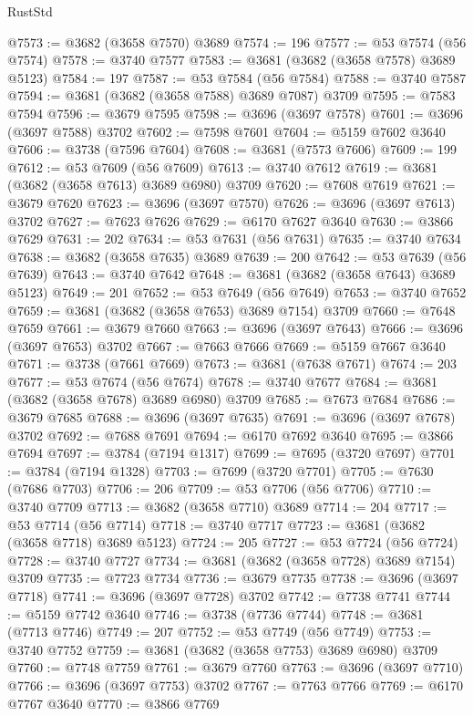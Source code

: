 \begin{lexlean}{RustStd}
\begin{coremodule}
@7573 := @3682 (@3658 @7570) @3689
@7574 := 196
@7577 := @53 @7574 (@56 @7574)
@7578 := @3740 @7577
@7583 := @3681 (@3682 (@3658 @7578) @3689 @5123)
@7584 := 197
@7587 := @53 @7584 (@56 @7584)
@7588 := @3740 @7587
@7594 := @3681 (@3682 (@3658 @7588) @3689 @7087) @3709
@7595 := @7583 @7594
@7596 := @3679 @7595
@7598 := @3696 (@3697 @7578)
@7601 := @3696 (@3697 @7588) @3702
@7602 := @7598 @7601
@7604 := @5159 @7602 @3640
@7606 := @3738 (@7596 @7604)
@7608 := @3681 (@7573 @7606)
@7609 := 199
@7612 := @53 @7609 (@56 @7609)
@7613 := @3740 @7612
@7619 := @3681 (@3682 (@3658 @7613) @3689 @6980) @3709
@7620 := @7608 @7619
@7621 := @3679 @7620
@7623 := @3696 (@3697 @7570)
@7626 := @3696 (@3697 @7613) @3702
@7627 := @7623 @7626
@7629 := @6170 @7627 @3640
@7630 := @3866 @7629
@7631 := 202
@7634 := @53 @7631 (@56 @7631)
@7635 := @3740 @7634
@7638 := @3682 (@3658 @7635) @3689
@7639 := 200
@7642 := @53 @7639 (@56 @7639)
@7643 := @3740 @7642
@7648 := @3681 (@3682 (@3658 @7643) @3689 @5123)
@7649 := 201
@7652 := @53 @7649 (@56 @7649)
@7653 := @3740 @7652
@7659 := @3681 (@3682 (@3658 @7653) @3689 @7154) @3709
@7660 := @7648 @7659
@7661 := @3679 @7660
@7663 := @3696 (@3697 @7643)
@7666 := @3696 (@3697 @7653) @3702
@7667 := @7663 @7666
@7669 := @5159 @7667 @3640
@7671 := @3738 (@7661 @7669)
@7673 := @3681 (@7638 @7671)
@7674 := 203
@7677 := @53 @7674 (@56 @7674)
@7678 := @3740 @7677
@7684 := @3681 (@3682 (@3658 @7678) @3689 @6980) @3709
@7685 := @7673 @7684
@7686 := @3679 @7685
@7688 := @3696 (@3697 @7635)
@7691 := @3696 (@3697 @7678) @3702
@7692 := @7688 @7691
@7694 := @6170 @7692 @3640
@7695 := @3866 @7694
@7697 := @3784 (@7194 @1317)
@7699 := @7695 (@3720 @7697)
@7701 := @3784 (@7194 @1328)
@7703 := @7699 (@3720 @7701)
@7705 := @7630 (@7686 @7703)
@7706 := 206
@7709 := @53 @7706 (@56 @7706)
@7710 := @3740 @7709
@7713 := @3682 (@3658 @7710) @3689
@7714 := 204
@7717 := @53 @7714 (@56 @7714)
@7718 := @3740 @7717
@7723 := @3681 (@3682 (@3658 @7718) @3689 @5123)
@7724 := 205
@7727 := @53 @7724 (@56 @7724)
@7728 := @3740 @7727
@7734 := @3681 (@3682 (@3658 @7728) @3689 @7154) @3709
@7735 := @7723 @7734
@7736 := @3679 @7735
@7738 := @3696 (@3697 @7718)
@7741 := @3696 (@3697 @7728) @3702
@7742 := @7738 @7741
@7744 := @5159 @7742 @3640
@7746 := @3738 (@7736 @7744)
@7748 := @3681 (@7713 @7746)
@7749 := 207
@7752 := @53 @7749 (@56 @7749)
@7753 := @3740 @7752
@7759 := @3681 (@3682 (@3658 @7753) @3689 @6980) @3709
@7760 := @7748 @7759
@7761 := @3679 @7760
@7763 := @3696 (@3697 @7710)
@7766 := @3696 (@3697 @7753) @3702
@7767 := @7763 @7766
@7769 := @6170 @7767 @3640
@7770 := @3866 @7769

\end{coremodule}
\end{lexlean}
